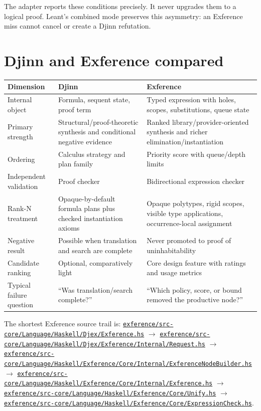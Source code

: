 \documentclass[10pt,letterpaper,oneside]{report}
\def\DjexBase{https://github.com/VladimirReshetnikov/Djex/blob/e454757d53ec057238c22fc6cd0d935b7d96b3dc/}
\newcommand{\dpath}[1]{\href{\DjexBase#1}{\nolinkurl{#1}}}
\begin{document}
The adapter reports these conditions precisely. It never upgrades them to a logical proof. Leant's combined mode preserves this asymmetry: an Exference miss cannot cancel or create a Djinn refutation.

\section{Djinn and Exference compared}

\begin{longtable}{@{}L{0.19\textwidth}L{0.36\textwidth}L{0.36\textwidth}@{}}
\toprule
\textbf{Dimension} & \textbf{Djinn} & \textbf{Exference} \\
\midrule
\endhead
Internal object & Formula, sequent state, proof term & Typed expression with holes, scopes, substitutions, queue state \\
Primary strength & Structural/proof-theoretic synthesis and conditional negative evidence & Ranked library/provider-oriented synthesis and richer elimination/instantiation \\
Ordering & Calculus strategy and plan family & Priority score with queue/depth limits \\
Independent validation & Proof checker & Bidirectional expression checker \\
Rank-N treatment & Opaque-by-default formula plans plus checked instantiation axioms & Opaque polytypes, rigid scopes, visible type applications, occurrence-local assignment \\
Negative result & Possible when translation and search are complete & Never promoted to proof of uninhabitability \\
Candidate ranking & Optional, comparatively light & Core design feature with ratings and usage metrics \\
Typical failure question & ``Was translation/search complete?'' & ``Which policy, score, or bound removed the productive node?'' \\
\bottomrule
\end{longtable}

\begin{sourcebox}
The shortest Exference source trail is: \dpath{exference/src-core/Language/Haskell/Djex/Exference.hs} $\rightarrow$ \dpath{exference/src-core/Language/Haskell/Djex/Exference/Internal/Request.hs} $\rightarrow$ \dpath{exference/src-core/Language/Haskell/Exference/Core/Internal/ExferenceNodeBuilder.hs} $\rightarrow$ \dpath{exference/src-core/Language/Haskell/Exference/Core/Internal/Exference.hs} $\rightarrow$ \dpath{exference/src-core/Language/Haskell/Exference/Core/Unify.hs} $\rightarrow$ \dpath{exference/src-core/Language/Haskell/Exference/Core/ExpressionCheck.hs}.
\end{sourcebox}
\end{document}
